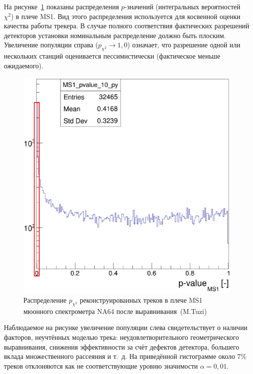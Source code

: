 На рисунке~\ref{fig:na64-muon-p-value-distribution} показаны распределения $p$-значений
(интегральных вероятностей $\chi^2$) в плече MS1. Вид этого распределения
используется для косвенной оценки качества работы трекера. В случае полного
соответствия фактических разрешений детекторов установки номинальным
распределение должно быть плоским. Увеличение популяции справа
($p_{\chi^2} \rightarrow 1{,}0$) означает, что разрешение одной или нескольких
станций оценивается пессимистически (фактическое меньше ожидаемого).
\begin{figure}[ht]
    \centering
    \includegraphics[width=0.5\linewidth]{images/na64-ms1-p-value-before.png}
    \caption{Распределение $p_{\chi^2}$ реконструированных треков в плече MS1 мюонного спектрометра NA64 после выравнивания~(M.Tuzi)}
    \label{fig:na64-muon-p-value-distribution}
\end{figure}

Наблюдаемое на рисунке увеличение популяции слева свидетельствует о наличии факторов,
неучтённых моделью трека: неудовлетворительного геометрического выравнивания, снижения
эффективности за счёт дефектов детектора, большего вклада множественного рассеяния и т.~д.
На приведённой гистограмме около 7\% треков отклоняются как не соответствующие уровню
значимости $\alpha = 0{,}01$.


